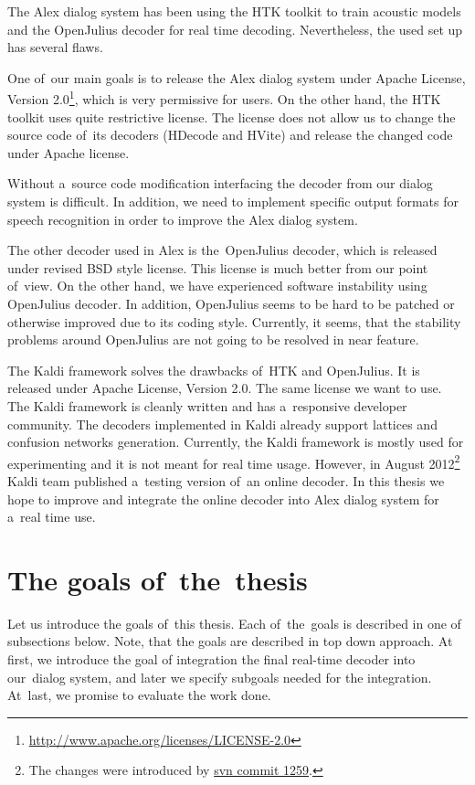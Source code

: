 The Alex dialog system has been using the \ac{HTK} toolkit\cite{young94htk} to train acoustic models and the OpenJulius\cite{lee2009julius} decoder for real time decoding. Nevertheless, the used set up has several flaws.

One of~our main goals is to release the Alex dialog system under Apache License, Version 2.0\footnote{\url{http://www.apache.org/licenses/LICENSE-2.0}}, which is very permissive for users. On the other hand, the \ac{HTK} toolkit uses quite restrictive license. The license does not allow us to change the source code of~its decoders (HDecode and HVite) and release the changed code under Apache license. 

Without a~source code modification interfacing the decoder from our dialog system is difficult. In addition, we need to implement specific output formats for speech recognition in order to improve the Alex dialog system.

The other decoder used in Alex is the~OpenJulius decoder, which is released under revised BSD style license. This license is much better from our point of~view. On the other hand, we have experienced software instability using OpenJulius decoder. In addition, OpenJulius seems to be hard to be patched or otherwise improved due to its coding style. Currently, it seems, that the stability problems around OpenJulius are not going to be resolved in near feature.

The Kaldi\cite{povey2011kaldi} framework solves the drawbacks of~\ac{HTK} and OpenJulius. It is released under Apache License, Version 2.0. The same license we want to use. The Kaldi framework is cleanly written and has a~responsive developer community. The decoders implemented in Kaldi already support lattices and confusion networks generation. Currently, the Kaldi framework is mostly used for experimenting and it is not meant for real time usage. However, in August 2012\footnote{The changes were introduced by \href{https://sourceforge.net/p/kaldi/code/1259/}{svn commit 1259}.} Kaldi team published a~testing version of~an online decoder. In this thesis we hope to improve and integrate the online decoder into Alex dialog system for a~real time use.


\section{The goals of~the~thesis} 
\label{sec:goals}
Let us introduce the goals of~this thesis. Each of~the~goals is described in one of subsections below. Note, that the goals are described in top down approach.
At first, we introduce the goal of integration the final real-time decoder into our~dialog system, and later we specify subgoals needed for the integration.
At~last, we promise to evaluate the work done.

